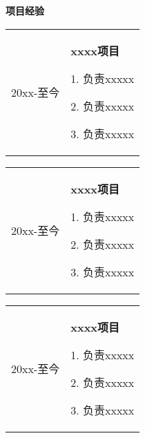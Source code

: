 \begin{flushleft}
  \Large\textbf{项目经验}
  \\[4mm]
  \normalsize{
    \begin{tabular}{p{} p{}}
      20xx-至今 & \textbf{xxxx项目}
                  \par 1. 负责xxxxx
                  \par 2. 负责xxxxx
                  \par 3. 负责xxxxx
    \end{tabular}
    \begin{tabular}{p{} p{}}
      20xx-至今 & \textbf{xxxx项目}
                  \par 1. 负责xxxxx
                  \par 2. 负责xxxxx
                  \par 3. 负责xxxxx
    \end{tabular}
    \begin{tabular}{p{} p{}}
      20xx-至今 & \textbf{xxxx项目}
                  \par 1. 负责xxxxx
                  \par 2. 负责xxxxx
                  \par 3. 负责xxxxx
    \end{tabular}
  }
\end{flushleft}